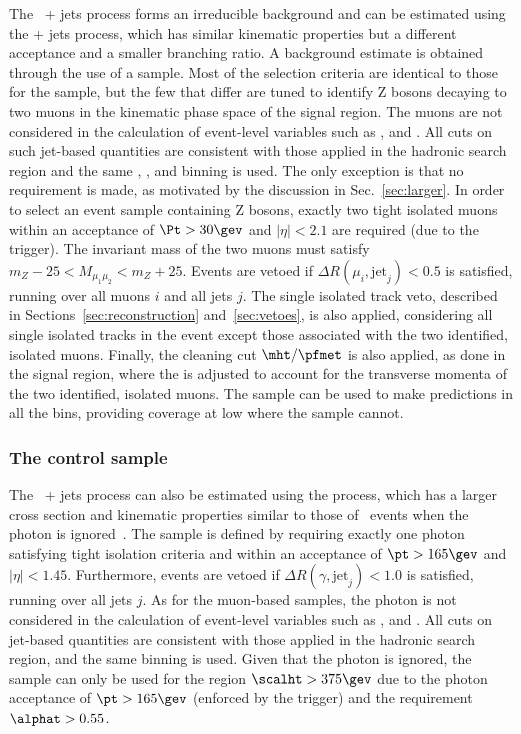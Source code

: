 The \znunu\ + jets process forms an irreducible background and can be
estimated using the \zmumu + jets process, which has similar kinematic
properties but a different acceptance and a smaller branching ratio. A
background estimate is obtained through the use of a \mmj sample. Most
of the selection criteria are identical to those for the \mj sample,
but the few that differ are tuned to identify Z bosons decaying to two
muons in the kinematic phase space of the signal region. The muons are
not considered in the calculation of event-level variables such as
\scalht, \mht and \alphat. All cuts on such jet-based quantities are
consistent with those applied in the hadronic search region and the
same \njet, \nb, and \scalht binning is used. The only exception is
that no \alphat requirement is made, as motivated by the discussion in
Sec.~\ref{sec:larger}. In order to select an event sample containing Z
bosons, exactly two tight isolated muons within an acceptance of $\Pt
> 30\gev$ and $|\eta| < 2.1$ are required (due to the trigger). The
invariant mass of the two muons must satisfy $m_{Z} - 25 <
M_{\mu_1\mu_2} < m_{Z} + 25$. Events are vetoed if $\Delta
R(\mu_{i},\textrm{jet}_j) < 0.5$ is satisfied, running over all muons
$i$ and all jets $j$. The single isolated track veto, described in
Sections~\ref{sec:reconstruction} and~\ref{sec:vetoes}, is also
applied, considering all single isolated tracks in the event except
those associated with the two identified, isolated muons. Finally, the
cleaning cut $\mht/\pfmet$ is also applied, as done in the signal
region, where the \pfmet is adjusted to account for the transverse
momenta of the two identified, isolated muons. The \mmj sample can be
used to make predictions in all the \scalht bins, providing coverage
at low \scalht where the \gj sample cannot.

\subsubsection{The \texorpdfstring{\gj}{photon plus jets} control sample}

The \znunu\ + jets process can also be estimated using the \gj
process, which has a larger cross section and kinematic properties
similar to those of \znunu\ events when the photon is
ignored~\cite{PAS-SUS-08-002,Bern:2011pa}. The \gj sample is defined
by requiring exactly one photon satisfying tight isolation criteria
and within an acceptance of $\pt > 165\gev$ and $|\eta| <
1.45$. Furthermore, events are vetoed if $\Delta
R(\gamma,\textrm{jet}_j) < 1.0$ is satisfied, running over all jets
$j$. As for the muon-based samples, the photon is not considered in
the calculation of event-level variables such as \scalht, \mht and
\alphat. All cuts on jet-based quantities are consistent with those
applied in the hadronic search region, and the same \HT binning is
used. Given that the photon is ignored, the \gj sample can only be
used for the region $\scalht > 375\gev$ due to the photon acceptance
of $\pt > 165\gev$ (enforced by the trigger) and the requirement
$\alphat > 0.55$.

